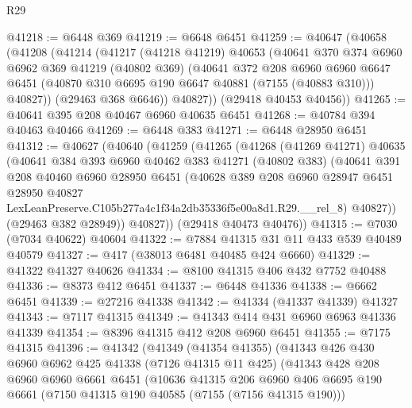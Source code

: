 \begin{lexlean}{R29}
\begin{coremodule}
@41218 := @6448 @369
@41219 := @6648 @6451
@41259 := @40647
    (@40658
      (@41208
        (@41214
          (@41217
            (@41218 @41219)
            @40653
            (@40641
              @370
              @374
              @6960
              @6962
              @369
              @41219
              (@40802 @369)
              (@40641
                @372
                @208
                @6960
                @6960
                @6647
                @6451
                (@40870 @310 @6695 @190 @6647 @40881 (@7155 (@40883 @310)))
                @40827))
            (@29463 @368 @6646))
          @40827))
      (@29418 @40453 @40456))
@41265 := @40641 @395 @208 @40467 @6960 @40635 @6451
@41268 := @40784 @394 @40463 @40466
@41269 := @6448 @383
@41271 := @6448 @28950 @6451
@41312 := @40627
    (@40640
      (@41259
        (@41265
          (@41268
            (@41269 @41271)
            @40635
            (@40641
              @384
              @393
              @6960
              @40462
              @383
              @41271
              (@40802 @383)
              (@40641
                @391
                @208
                @40460
                @6960
                @28950
                @6451
                (@40628
                  @389
                  @208
                  @6960
                  @28947
                  @6451
                  @28950
                  @40827
                  LexLeanPreserve.C105b277a4c1f34a2db35336f5e00a8d1.R29.__rel_8)
                @40827))
            (@29463 @382 @28949))
          @40827))
      (@29418 @40473 @40476))
@41315 := @7030 (@7034 @40622) @40604
@41322 := @7884 @41315 @31 @11 @433 @539 @40489 @40579
@41327 := @417 (@38013 @6481 @40485 @424 @6660)
@41329 := @41322 @41327 @40626
@41334 := @8100 @41315 @406 @432 @7752 @40488
@41336 := @8373 @412 @6451
@41337 := @6448 @41336
@41338 := @6662 @6451
@41339 := @27216 @41338
@41342 := @41334 (@41337 @41339) @41327
@41343 := @7117 @41315
@41349 := @41343 @414 @431 @6960 @6963 @41336 @41339
@41354 := @8396 @41315 @412 @208 @6960 @6451
@41355 := @7175 @41315
@41396 := @41342
    (@41349
      (@41354 @41355)
      (@41343
        @426
        @430
        @6960
        @6962
        @425
        @41338
        (@7126 @41315 @11 @425)
        (@41343
          @428
          @208
          @6960
          @6960
          @6661
          @6451
          (@10636
            @41315
            @206
            @6960
            @406
            @6695
            @190
            @6661
            (@7150 @41315 @190 @40585 (@7155 (@7156 @41315 @190)))

\end{coremodule}
\end{lexlean}
